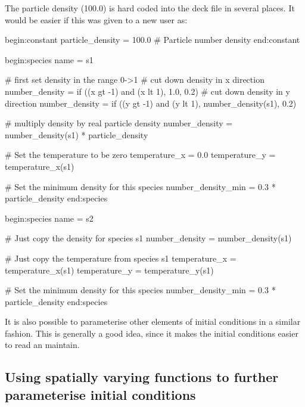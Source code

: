The particle density (100.0) is hard coded into the deck file in several
places. It would be easier if this was given to a new user as:
\begin{boxverbatim}
begin:constant
   particle_density = 100.0 # Particle number density
end:constant

begin:species
   name = s1

   # first set density in the range 0->1
   # cut down density in x direction
   number_density = if ((x gt -1) and (x lt 1), 1.0, 0.2)
   # cut down density in y direction
   number_density = if ((y gt -1) and (y lt 1), number_density(s1), 0.2)

   # multiply density by real particle density
   number_density = number_density(s1) * particle_density

   # Set the temperature to be zero
   temperature_x = 0.0
   temperature_y = temperature_x(s1)

   # Set the minimum density for this species
   number_density_min = 0.3 * particle_density
end:species

begin:species
   name = s2

   # Just copy the density for species s1
   number_density = number_density(s1)

   # Just copy the temperature from species s1
   temperature_x = temperature_x(s1)
   temperature_y = temperature_y(s1)

   # Set the minimum density for this species
   number_density_min = 0.3 * particle_density
end:species
\end{boxverbatim}

It is also possible to parameterise other elements of initial conditions in a
similar fashion. This is generally a good idea, since it makes the
initial conditions easier to read an maintain.

\subsection{Using spatially varying functions to further parameterise
  initial conditions}


